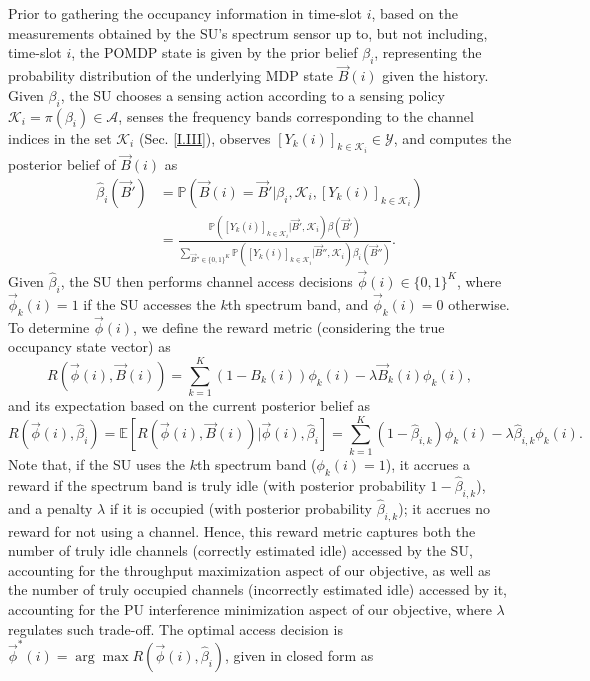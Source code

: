 \documentclass[12pt, draftcls, onecolumn]{IEEEtran}
\begin{document}
Prior to gathering the occupancy information in time-slot $i$, based on the measurements obtained by the SU's spectrum sensor up to, but not including, time-slot $i$, the POMDP state is given by the prior belief $\beta_{i}$, representing the probability distribution of the underlying MDP state $\vec{B}(i)$ given the history. Given $\beta_{i}$, the SU chooses a sensing action according to a sensing policy $\mathcal{K}_{i}=\pi(\beta_{i}){\in}\mathcal{A}$, 
senses the frequency bands corresponding to the channel indices in the set $\mathcal{K}_{i}$ (Sec. \ref{I.III}), observes $[Y_{k}(i)]_{k{\in}\mathcal{K}_{i}}{\in}\mathcal{Y}$, and computes the posterior belief of $\vec{B}(i)$ as
\begin{equation}\label{10}
    \begin{aligned}
        \hat{\beta}_{i}(\vec{B}')&=\mathbb{P}(\vec{B}(i)=\vec{B}'|\beta_{i},\mathcal{K}_{i},[Y_{k}(i)]_{k{\in}\mathcal{K}_{i}})\\
        &=\frac{\mathbb{P}([Y_{k}(i)]_{k{\in}\mathcal{K}_{i}}|\vec{B}',\mathcal{K}_{i})\beta(\vec{B}')}{\sum_{\vec{B}'' \in \{0,1\}^{K}}\mathbb{P}([Y_{k}(i)]_{k{\in}\mathcal{K}_{i}}|\vec{B}'',\mathcal{K}_{i})\beta_{i}(\vec{B}'')}.
    \end{aligned}
\end{equation}
Given  $ \hat{\beta}_{i}$, the SU then performs channel access decisions
$\vec{\phi}(i)\in\{0,1\}^K$, where
$\vec{\phi}_k(i)=1$ if the SU accesses the $k$th spectrum band, and $\vec{\phi}_k(i)=0$ otherwise. To determine $\vec{\phi}(i)$, we define the reward metric (considering the true occupancy state vector) as
\begin{equation}\label{12a}
    R(\vec{\phi}(i),\vec{B}(i))=\sum_{k=1}^{K}(1-B_{k}(i))\phi_{k}(i)-\lambda \vec{B}_{k}(i)\phi_k(i),
\end{equation}
and its expectation based on the current posterior belief as
\begin{equation}\label{12}
    R(\vec{\phi}(i),\hat{\beta}_{i})=\mathbb{E}[R(\vec{\phi}(i),\vec{B}(i))|\vec{\phi}(i),\hat{\beta}_{i}]=\sum_{k=1}^{K}(1-\hat{\beta}_{i,k})\phi_{k}(i)-\lambda \hat{\beta}_{i,k}\phi_k(i).
\end{equation}
Note that, if the SU uses the $k$th spectrum band ($\phi_{k}(i)=1$), it accrues a reward if the
spectrum band is truly idle (with posterior probability $1-\hat{\beta}_{i,k}$), and a penalty $\lambda$ if it is occupied (with posterior probability $\hat{\beta}_{i,k}$); it accrues no reward for not using a channel. Hence, this reward metric captures both the number of truly idle channels (correctly estimated idle) accessed by the SU, accounting for the throughput maximization aspect of our objective, as well as the number of truly occupied channels (incorrectly estimated idle) accessed by it, accounting for the PU interference minimization aspect of our objective, where $\lambda$ regulates such trade-off. The optimal access decision is $\vec{\phi}^{*}(i){=}\arg\max R(\vec{\phi}(i),\hat{\beta}_{i})$, given in closed form as
\end{document}
